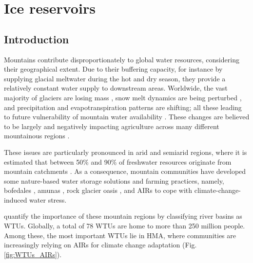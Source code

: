 \chapter{Ice reservoirs}



\section{Introduction}

Mountains contribute disproportionately to global water resources, considering their geographical extent.
Due to their buffering capacity, for instance by supplying glacial meltwater during the hot and dry season,
they provide a relatively constant water supply to downstream areas. Worldwide, the vast majority of glaciers
are losing mass \citep{zempGlobalGlacierMass2019a}, snow melt dynamics are being perturbed
\citep{mukhopadhyayReevaluationSnowmeltGlacial2015, hammondGlobalSnowZone2018}, and precipitation and
evapotranspiration patterns are shifting; all these leading to future vulnerability of mountain water availability
\citep{lutzConsistentIncreaseHigh2014}. These changes are believed to be largely and negatively
impacting agriculture across many different mountainous regions \citep{ipccCrossChapterPaperMountains2022}.

These issues are particularly pronounced in arid and semiarid regions, where it is estimated that between 50\%
and 90\% of freshwater resources originate from mountain catchments
\citep{mukhopadhyayReevaluationSnowmeltGlacial2015, messerliMountainsWorldVulnerable2004}. As a consequence,
mountain communities have developed some nature-based water storage solutions and farming practices, namely,
bofedales \citep{monge-salazarEcohydrologyEcosystemServices2022}, amunas
\citep{ochoa-tocachiPotentialContributionsPreInca2019}, rock glacier oasis \citep{pandeyRockGlacierOasis2022},
and \ac{AIRs} \citep{wangchukIceStupaCompetition2020} to cope with climate-change-induced water stress.

\citet{immerzeelImportanceVulnerabilityWorld2020} quantify the importance of these mountain regions by
classifying river basins as \ac{WTUs}. Globally, a total of 78 \ac{WTUs} are home to more than 250 million
people. Among these, the most important WTUs lie in \ac{HMA}, where communities are increasingly relying on
\ac{AIRs} for climate change adaptation (Fig. \ref{fig:WTUs_AIRs}). 

